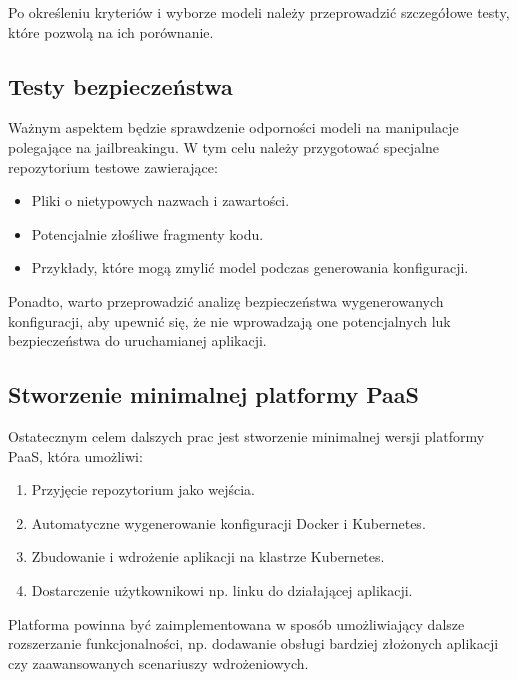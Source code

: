 Po określeniu kryteriów i wyborze modeli należy przeprowadzić szczegółowe testy, które pozwolą na ich porównanie.

\subsection{Testy bezpieczeństwa}

Ważnym aspektem będzie sprawdzenie odporności modeli na manipulacje polegające na jailbreakingu. W tym celu należy przygotować specjalne repozytorium testowe zawierające:

\begin{itemize}
    \item Pliki o nietypowych nazwach i zawartości.
    \item Potencjalnie złośliwe fragmenty kodu.
    \item Przykłady, które mogą zmylić model podczas generowania konfiguracji.
\end{itemize}

Ponadto, warto przeprowadzić analizę bezpieczeństwa wygenerowanych konfiguracji, aby upewnić się, że nie wprowadzają one potencjalnych luk bezpieczeństwa do uruchamianej aplikacji.

\subsection{Stworzenie minimalnej platformy PaaS}

Ostatecznym celem dalszych prac jest stworzenie minimalnej wersji platformy PaaS, która umożliwi:

\begin{enumerate}
    \item Przyjęcie repozytorium jako wejścia.
    \item Automatyczne wygenerowanie konfiguracji Docker i Kubernetes.
    \item Zbudowanie i wdrożenie aplikacji na klastrze Kubernetes.
    \item Dostarczenie użytkownikowi np. linku do działającej aplikacji.
\end{enumerate}

Platforma powinna być zaimplementowana w sposób umożliwiający dalsze rozszerzanie funkcjonalności, np. dodawanie obsługi bardziej złożonych aplikacji czy zaawansowanych scenariuszy wdrożeniowych.